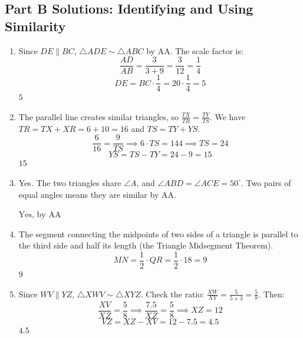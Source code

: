\documentclass[14pt]{extarticle}
\begin{document}
\subsection*{Part B Solutions: Identifying and Using Similarity}
\begin{enumerate}
  \item Since \(DE \parallel BC\), \(\triangle ADE \sim \triangle ABC\) by AA. The scale factor is:
  \[
  \frac{AD}{AB} = \frac{3}{3 + 9} = \frac{3}{12} = \frac{1}{4}
  \]
  \[
  DE = BC \cdot \frac{1}{4} = 20 \cdot \frac{1}{4} = 5
  \]
  \(\boxed{5}\)

  \item The parallel line creates similar triangles, so \(\frac{TX}{TR} = \frac{TY}{TS}\). We have \(TR = TX + XR = 6 + 10 = 16\) and \(TS = TY + YS\).
  \[
  \frac{6}{16} = \frac{9}{TS} \implies 6 \cdot TS = 144 \implies TS = 24
  \]
  \[
  YS = TS - TY = 24 - 9 = 15
  \]
  \(\boxed{15}\)

  \item Yes. The two triangles share \(\angle A\), and \(\angle ABD = \angle ACE = 50^\circ\). Two pairs of equal angles means they are similar by AA.

  \(\boxed{\text{Yes, by AA}}\)

  \item The segment connecting the midpoints of two sides of a triangle is parallel to the third side and half its length (the Triangle Midsegment Theorem).
  \[
  MN = \frac{1}{2} \cdot QR = \frac{1}{2} \cdot 18 = 9
  \]
  \(\boxed{9}\)

  \item Since \(WV \parallel YZ\), \(\triangle XWV \sim \triangle XYZ\). Check the ratio: \(\frac{XW}{XY} = \frac{5}{5 + 3} = \frac{5}{8}\). Then:
  \[
  \frac{XV}{XZ} = \frac{5}{8} \implies \frac{7.5}{XZ} = \frac{5}{8} \implies XZ = 12
  \]
  \[
  VZ = XZ - XV = 12 - 7.5 = 4.5
  \]
  \(\boxed{4.5}\)
\end{enumerate}
\end{document}
